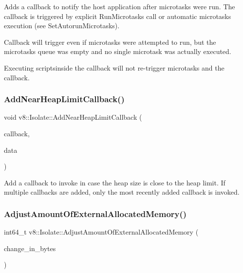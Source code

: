 Adds a callback to notify the host application after microtasks were run. The callback is triggered by explicit Run\+Microtasks call or automatic microtasks execution (see Set\+Autorun\+Microtasks).

Callback will trigger even if microtasks were attempted to run, but the microtasks queue was empty and no single microtask was actually executed.

Executing scriptsinside the callback will not re-\/trigger microtasks and the callback. \mbox{\label{classv8_1_1Isolate_ae6fc7e1186beb40707180dd58456f741}} 
\subsubsection{\texorpdfstring{Add\+Near\+Heap\+Limit\+Callback()}{AddNearHeapLimitCallback()}}
{\footnotesize\ttfamily void v8\+::\+Isolate\+::\+Add\+Near\+Heap\+Limit\+Callback (\begin{DoxyParamCaption}\item[{\mbox{\hyperlink{namespacev8_af4357cae607e45cd9e9c4fda1cc03218}{Near\+Heap\+Limit\+Callback}}}]{callback,  }\item[{void $\ast$}]{data }\end{DoxyParamCaption})}

Add a callback to invoke in case the heap size is close to the heap limit. If multiple callbacks are added, only the most recently added callback is invoked. \mbox{\label{classv8_1_1Isolate_aaeda5fa60961a3d9d476c46200e30711}} 
\subsubsection{\texorpdfstring{Adjust\+Amount\+Of\+External\+Allocated\+Memory()}{AdjustAmountOfExternalAllocatedMemory()}}
{\footnotesize\ttfamily int64\+\_\+t v8\+::\+Isolate\+::\+Adjust\+Amount\+Of\+External\+Allocated\+Memory (\begin{DoxyParamCaption}\item[{int64\+\_\+t}]{change\+\_\+in\+\_\+bytes }\end{DoxyParamCaption})}

